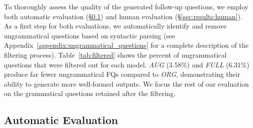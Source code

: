 To thoroughly assess the quality of the generated follow-up questions, we employ both automatic evaluation (\S\ref{sec:results:auto}) and human evaluation (\S\ref{sec:results:human}). As a first step for both evaluations, we automatically identify and remove ungrammatical questions based on syntactic parsing (see Appendix~\ref{appendix:ungrammatical_questions} for a complete description of the filtering process). Table~\ref{tab:filtered} shows the percent of ungrammatical questions that were filtered out for each model. \textit{AUG} (3.58\%) and \textit{FULL} (6.31\%) produce far fewer ungrammatical FQs compared to \textit{ORG}, demonstrating their ability to generate more well-formed outputs. We focus the rest of our evaluation on the grammatical questions retained after the filtering.




\subsection{Automatic Evaluation}
\label{sec:results:auto}



